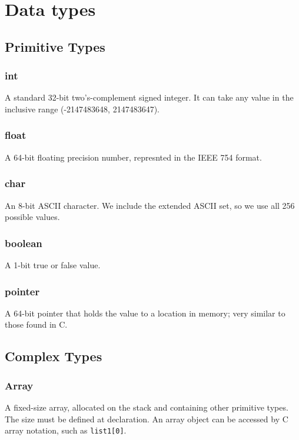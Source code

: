 \chapter{Data types}
    \section{Primitive Types}
        \subsection{int}
            A standard 32-bit two's-complement signed integer. It can take any value in the inclusive range (-2147483648, 2147483647).
        \subsection{float}
            A 64-bit floating precision number, represnted in the IEEE 754 format.            
        \subsection{char}
            An 8-bit ASCII character. We include the extended ASCII set, so we use all 256 possible values.
        \subsection{boolean}
            A 1-bit true or false value.
        \subsection{pointer}
            A 64-bit pointer that holds the value to a location in memory; very similar to those found in C.
    \section{Complex Types}
        \subsection{Array}
            A fixed-size array, allocated on the stack and containing other primitive types. The size must be defined at declaration. An array object can be accessed by C array notation, such as \texttt{list1[0]}.
 \iffalse       \subsection{struct}
            A struct is a simple user-defined data structure that holds various primitives, similar to the ones found in C. 
 \fi
